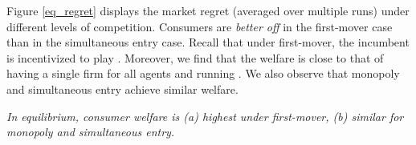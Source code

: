 \documentclass[../competing_bandits_with_appendix.tex]{subfiles}
\begin{document}
Figure \ref{eq_regret} displays the market regret (averaged
  over multiple runs) under different levels of competition.
Consumers are \textit{better off} in the first-mover case than in
the simultaneous entry case. Recall that under first-mover, the incumbent is incentivized to play \Thompson. Moreover, we find that the welfare is close to that of having a single firm for all agents and running \Thompson. We also observe that monopoly and simultaneous entry achieve similar welfare.

\begin{finding}\label{find:welfare}
\textit{In equilibrium, consumer welfare is (a) highest under first-mover, (b) similar for monopoly and simultaneous entry.
}
\end{finding}
\end{document}
